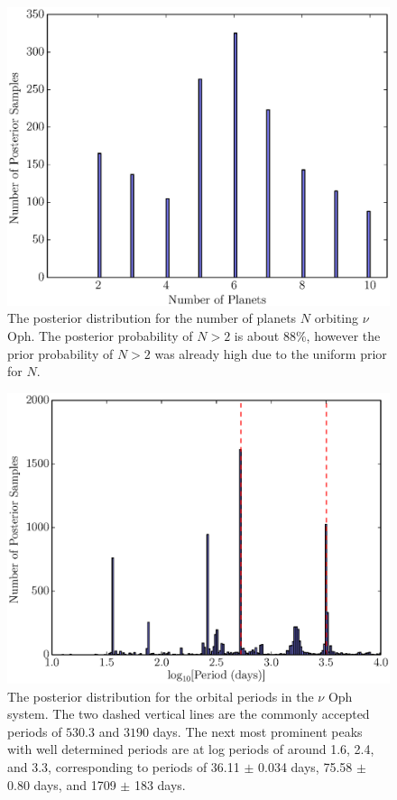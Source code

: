 \documentclass[useAMS,usenatbib]{mn2e}
\begin{document}
\begin{figure}
\includegraphics[scale=0.45]{Figures/nu_oph_N.eps}
\caption{The posterior distribution for the number of planets $N$ orbiting
$\nu$ Oph. The posterior probability of $N > 2$ is about 88\%, however the
prior probability of $N > 2$ was already high due to the uniform prior for $N$.
\label{fig:nu_oph_N}}
\end{figure}

\begin{figure}
\includegraphics[scale=0.45]{Figures/nu_oph_periods.eps}
\caption{The posterior distribution for the orbital periods in the $\nu$ Oph
system. The two dashed vertical lines are the commonly accepted periods
of $530.3$ and $3190$ days. The next most prominent peaks with well determined
periods are at log periods of around 1.6, 2.4, and 3.3, corresponding to
periods of 36.11 $\pm$ 0.034 days,
75.58 $\pm$ 0.80 days, and 1709 $\pm$ 183 days.\label{fig:nu_oph_periods}}
\end{figure}
\end{document}
